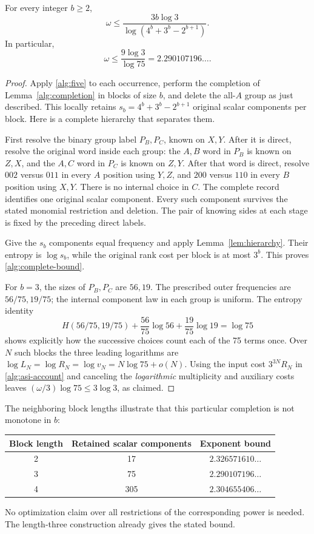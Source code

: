 \begin{theorem}
\label{thm:elementary}
For every integer \(b\geq2\),
\begin{equation}
 \omega\leq
 \frac{3b\log3}{\log(4^b+3^b-2^{b+1})}.
 \label{alg:complete-bound}
\end{equation}
In particular,
\[
 \omega\leq\frac{9\log3}{\log75}=2.290107196\ldots.
\]
\end{theorem}
\begin{proof}
Apply \eqref{alg:five} to each occurrence, perform the completion of
Lemma~\ref{alg:completion} in blocks of size \(b\), and delete the
all-\(A\) group as just described.  This locally retains
\(s_b=4^b+3^b-2^{b+1}\) original scalar components per block.
Here is a complete hierarchy that separates them.

First resolve the binary group label \(P_B,P_C\), known on \(X,Y\).
After it is direct, resolve the original word inside each group: the
\(A,B\) word in \(P_B\) is known on \(Z,X\), and the \(A,C\) word
in \(P_C\) is known on \(Z,Y\).  After that word is direct, resolve
\(002\) versus \(011\) in every \(A\) position using \(Y,Z\), and
\(200\) versus \(110\) in every \(B\) position using \(X,Y\).
There is no internal choice in \(C\).  The complete record identifies
one original scalar component.  Every such component survives the stated
monomial restriction and deletion.  The pair of knowing sides at each
stage is fixed by the preceding direct labels.

Give the \(s_b\) components equal frequency and apply
Lemma~\ref{lem:hierarchy}.  Their entropy is \(\log s_b\), while the
original rank cost per block is at most \(3^b\).  This proves
\eqref{alg:complete-bound}.

For \(b=3\), the sizes of \(P_B,P_C\) are \(56,19\).  The prescribed
outer frequencies are \(56/75,19/75\); the internal component law in
each group is uniform.  The entropy identity
\[
 H(56/75,19/75)+\frac{56}{75}\log56+\frac{19}{75}\log19=\log75
\]
shows explicitly how the successive choices count each of the 75 terms
once.  Over \(N\) such blocks the three leading logarithms are
\(\log L_N=\log R_N=\log v_N=N\log75+o(N)\).
Using the input cost \(3^{3N}R_N\) in
\eqref{alg:asi-account} and canceling the \emph{logarithmic} multiplicity
and auxiliary costs leaves
\((\omega/3)\log75\leq3\log3\), as claimed.
\end{proof}

The neighboring block lengths illustrate that this particular completion
is not monotone in \(b\):
\begin{center}
\begin{tabular}{@{}ccc@{}}
\toprule
Block length & Retained scalar components & Exponent bound \\
\midrule
2 & 17 & \(2.326571610\ldots\) \\
3 & 75 & \(2.290107196\ldots\) \\
4 & 305 & \(2.304655406\ldots\) \\
\bottomrule
\end{tabular}
\end{center}
No optimization claim over all restrictions of the corresponding power is
needed.  The length-three construction already gives the stated bound.

